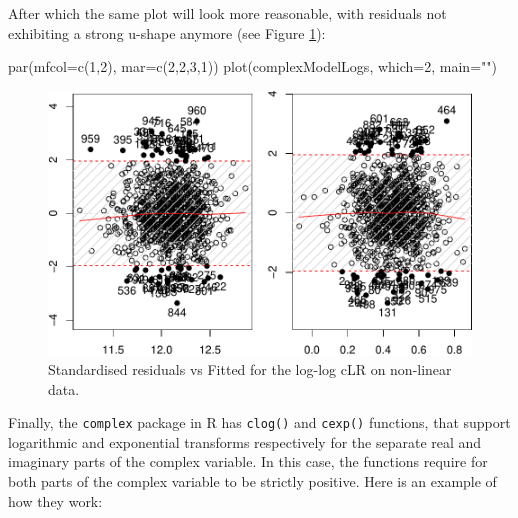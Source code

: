 \documentclass[
]{book}
\newenvironment{Shaded}{\begin{snugshade}}{\end{snugshade}}
\newcommand{\AttributeTok}[1]{\textcolor[rgb]{0.77,0.63,0.00}{#1}}
\newcommand{\DecValTok}[1]{\textcolor[rgb]{0.00,0.00,0.81}{#1}}
\newcommand{\FunctionTok}[1]{\textcolor[rgb]{0.00,0.00,0.00}{#1}}
\newcommand{\NormalTok}[1]{#1}
\newcommand{\StringTok}[1]{\textcolor[rgb]{0.31,0.60,0.02}{#1}}
\begin{document}
After which the same plot will look more reasonable, with residuals not exhibiting a strong u-shape anymore (see Figure \ref{fig:nonlinearStdResid}):

\begin{Shaded}
\begin{Highlighting}[]
\FunctionTok{par}\NormalTok{(}\AttributeTok{mfcol=}\FunctionTok{c}\NormalTok{(}\DecValTok{1}\NormalTok{,}\DecValTok{2}\NormalTok{), }\AttributeTok{mar=}\FunctionTok{c}\NormalTok{(}\DecValTok{2}\NormalTok{,}\DecValTok{2}\NormalTok{,}\DecValTok{3}\NormalTok{,}\DecValTok{1}\NormalTok{))}
\FunctionTok{plot}\NormalTok{(complexModelLogs, }\AttributeTok{which=}\DecValTok{2}\NormalTok{, }\AttributeTok{main=}\StringTok{""}\NormalTok{)}
\end{Highlighting}
\end{Shaded}

\begin{figure}
\centering
\includegraphics{Svetunkov---Svetunkov---Complex-Valued-Econometrics_files/figure-latex/nonlinearStdResid-1.pdf}
\caption{\label{fig:nonlinearStdResid}Standardised residuals vs Fitted for the log-log cLR on non-linear data.}
\end{figure}

Finally, the \texttt{complex} package in R has \texttt{clog()} and \texttt{cexp()} functions, that support logarithmic and exponential transforms respectively for the separate real and imaginary parts of the complex variable. In this case, the functions require for both parts of the complex variable to be strictly positive. Here is an example of how they work:
\end{document}
